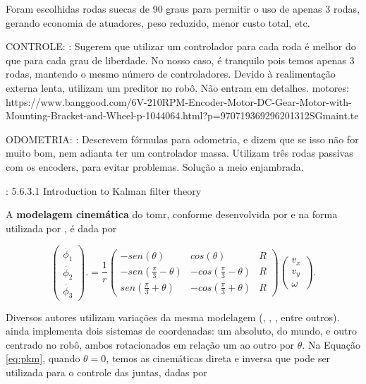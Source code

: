 Foram escolhidas rodas suecas de 90 graus para permitir o uso de apenas 3 rodas, gerando economia de atuadores, peso reduzido, menor custo total, etc.

 CONTROLE:
 \cite{rojas2006holonomic}: Sugerem que utilizar um controlador para cada roda é melhor do que para cada grau de liberdade. No nosso caso, é tranquilo pois temos apenas 3 rodas, mantendo o mesmo número de controladores. Devido à realimentação externa lenta, utilizam um preditor no robô. Não entram em detalhes.
motores:
https://www.banggood.com/6V-210RPM-Encoder-Motor-DC-Gear-Motor-with-Mounting-Bracket-and-Wheel-p-1044064.html?p=970719369296201312SGmaint.te

ODOMETRIA:
\cite{samani2007comprehensive}: Descrevem fórmulas para odometria, e dizem que se isso não for muito bom, nem adianta ter um controlador massa. Utilizam três rodas passivas com os encoders, para evitar problemas. Solução a meio enjambrada.

\cite{siegwart2011introduction}: 5.6.3.1 Introduction to Kalman filter theory

A \textbf{modelagem cinemática} do \acrshort{tomr}, conforme desenvolvida por \cite{campion1996structural} e na forma utilizada por \cite{samani2007comprehensive}, é dada por

\begin{equation}
  \begin{pmatrix}
    \dot{\phi_1} \\
    \dot{\phi_2} \\
    \dot{\phi_3}
  \end{pmatrix}.
  =
  \frac{1}{r}
  \begin{pmatrix}
    -sen(\theta)               & cos(\theta)                & R \\
    -sen(\frac{\pi}{3}-\theta) & -cos(\frac{\pi}{3}-\theta) & R \\
    sen(\frac{\pi}{3}+\theta)  & -cos(\frac{\pi}{3}+\theta) & R
  \end{pmatrix}
  \begin{pmatrix}
    v_x \\
    v_y \\
    \omega
  \end{pmatrix}.
  \label{eq:pkm}
\end{equation}

Diversos autores utilizam variações da mesma modelagem (\cite{rojas2006holonomic}, \cite{ritter2016modelagem}, \cite{pin1994new}, entre outros). \cite{ritter2016modelagem} ainda implementa dois sistemas de coordenadas: um absoluto, do mundo, e outro centrado no robô, ambos rotacionados em relação um ao outro por $\theta$. Na Equação \ref{eq:pkm}, quando $\theta = 0$, temos as cinemáticas direta e inversa que pode ser utilizada para o controle das juntas, dadas por

